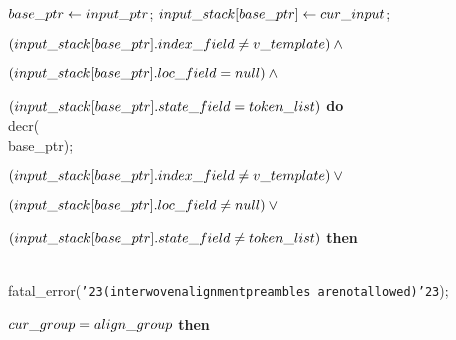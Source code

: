 {\ninepoint\noindent
{} $\\{base\_ptr}\gets\\{input\_ptr}$;
 $\\{input\_stack}[\\{base\_ptr}]\gets\\{cur\_input}$;\par\noindent
{} $(\\{input\_stack}[\\{base\_ptr}].\\{index\_field}\ne
  \\{v\_template}) \land{}$\par\noindent
\quad\qquad $(\\{input\_stack}[\\{base\_ptr}].\\{loc\_field}=
  \\{null}) \land {}$\par\noindent
\quad\qquad $(\\{input\_stack}[\\{base\_ptr}].\\{state\_field}=
  \\{token\_list})$ {\bf do} \\{decr}(\\{base\_ptr});\par\noindent
{} $(\\{input\_stack}[\\{base\_ptr}].\\{index\_field}\ne
  \\{v\_template}) \lor {}$\par\noindent
\quad\qquad $(\\{input\_stack}[\\{base\_ptr}].\\{loc\_field}\ne
  \\{null}) \lor {}$\par\noindent
\quad\qquad $(\\{input\_stack}[\\{base\_ptr}].\\{state\_field}\ne
  \\{token\_list})$ {\bf then}\par\noindent
\qquad\\{fatal\_error}(\hbox{\tt\char'23(interwoven\]alignment\]preambles\]%
    are\]not\]allowed)\char'23});\par\noindent
{} $\\{cur\_group}=\\{align\_group}$ {\bf then}

}
